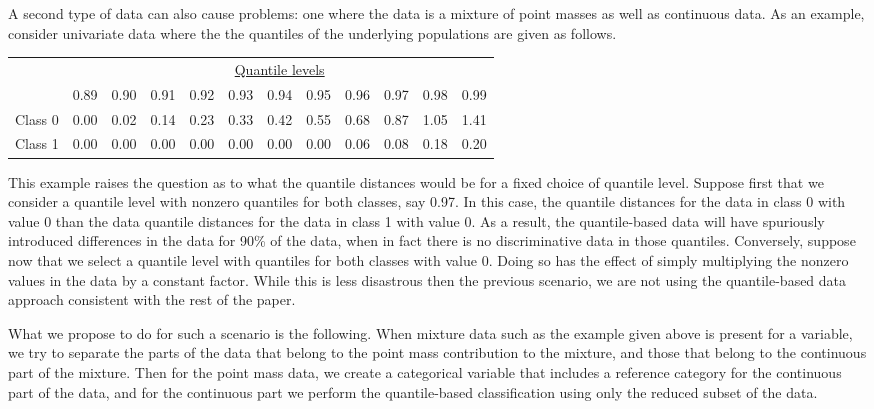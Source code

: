 A second type of data can also cause problems:  one where the data is a mixture
of point masses as well as continuous data.  As an example, consider univariate
data where the the quantiles of the underlying populations are given as follows.
\begin{center}
  \begin{tabular}{lrrrrrrrrrrr}
    \toprule
    & \multicolumn{11}{c}{\underline{Quantile levels}} \\
    & 0.89 & 0.90 & 0.91 & 0.92 & 0.93 & 0.94 & 0.95 & 0.96 & 0.97 & 0.98 & 0.99 \\
    \midrule
    Class 0 & 0.00 & 0.02 & 0.14 & 0.23 & 0.33 & 0.42 & 0.55 & 0.68 & 0.87 & 1.05 & 1.41 \\
    Class 1 & 0.00 & 0.00 & 0.00 & 0.00 & 0.00 & 0.00 & 0.00 & 0.06 & 0.08 & 0.18 & 0.20 \\
    \bottomrule
  \end{tabular}
\end{center}
This example raises the question as to what the quantile distances would be for
a fixed choice of quantile level.  Suppose first that we consider a quantile
level with nonzero quantiles for both classes, say 0.97.  In this case, the
quantile distances for the data in class 0 with value 0 than the data quantile
distances for the data in class 1 with value 0.  As a result, the quantile-based
data will have spuriously introduced differences in the data for 90\% of the
data, when in fact there is no discriminative data in those quantiles.
Conversely, suppose now that we select a quantile level with quantiles for both
classes with value 0.  Doing so has the effect of simply multiplying the nonzero
values in the data by a constant factor.  While this is less disastrous then the
previous scenario, we are not using the quantile-based data approach consistent
with the rest of the paper.

What we propose to do for such a scenario is the following.  When mixture data
such as the example given above is present for a variable, we try to separate
the parts of the data that belong to the point mass contribution to the mixture,
and those that belong to the continuous part of the mixture.  Then for the point
mass data, we create a categorical variable that includes a reference category
for the continuous part of the data, and for the continuous part we perform the
quantile-based classification using only the reduced subset of the data.









